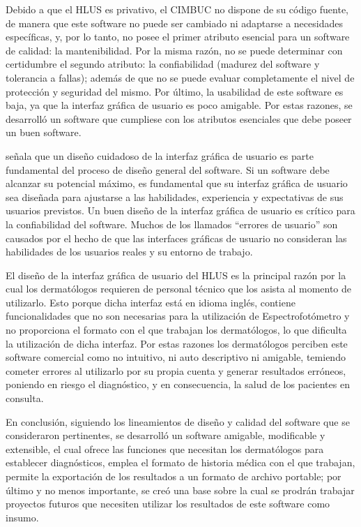Debido a que el HLUS es privativo, el CIMBUC no dispone de su c\'{o}digo fuente, de manera que este software no puede ser cambiado ni adaptarse a necesidades espec\'{i}ficas, y, por lo tanto, no posee el primer atributo esencial para un software de calidad: la mantenibilidad. Por la misma raz\'{o}n, no se puede determinar con certidumbre el segundo atributo: la confiabilidad (madurez del software y tolerancia a fallas); adem\'{a}s de que no se puede evaluar completamente el nivel de protecci\'{o}n y seguridad del mismo. Por \'{u}ltimo, la usabilidad de este software es baja, ya que la interfaz gr\'{a}fica de usuario es poco amigable. Por estas razones, se desarroll\'{o} un software que cumpliese con los atributos esenciales que debe poseer un buen software.

\cite{Sommerville} se\~{n}ala que un dise\~{n}o cuidadoso de la interfaz gr\'{a}fica de usuario es parte fundamental del proceso de dise\~{n}o general del software. Si un software debe alcanzar su potencial m\'{a}ximo, es fundamental que su interfaz gr\'{a}fica de usuario sea dise\~{n}ada para ajustarse a las habilidades, experiencia y expectativas de sus usuarios previstos. Un buen dise\~{n}o de la interfaz gr\'{a}fica de usuario es cr\'{i}tico para la confiabilidad del software. Muchos de los llamados ``errores de usuario'' son causados por el hecho de que las interfaces gr\'{a}ficas de usuario no consideran las habilidades de los usuarios reales y su entorno de trabajo.

El dise\~{n}o de la interfaz gr\'{a}fica de usuario del HLUS es la principal raz\'{o}n por la cual los dermat\'{o}logos requieren de personal t\'{e}cnico que los asista al momento de utilizarlo. Esto porque dicha interfaz est\'{a} en idioma ingl\'{e}s, contiene funcionalidades que no son necesarias para la utilizaci\'{o}n de Espectrofot\'{o}metro y no proporciona el formato con el que trabajan los dermat\'{o}logos, lo que dificulta la utilizaci\'{o}n de dicha interfaz. Por estas razones los dermat\'{o}logos perciben este software comercial como no intuitivo, ni auto descriptivo ni amigable, temiendo cometer errores al utilizarlo por su propia cuenta y generar resultados err\'{o}neos, poniendo en riesgo el diagn\'{o}stico, y en consecuencia, la salud de los pacientes en consulta.

En conclusi\'{o}n, siguiendo los lineamientos de dise\~{n}o y calidad del software que se consideraron pertinentes, se desarroll\'{o} un software amigable, modificable y extensible, el cual ofrece las funciones que necesitan los dermat\'{o}logos para establecer diagn\'{o}sticos, emplea el formato de historia m\'{e}dica con el que trabajan, permite la exportaci\'{o}n de los resultados a un formato de archivo portable; por \'{u}ltimo y no menos importante, se cre\'{o} una base sobre la cual se prodr\'{a}n trabajar proyectos futuros que necesiten utilizar los resultados de este software como insumo.
	\newpage

